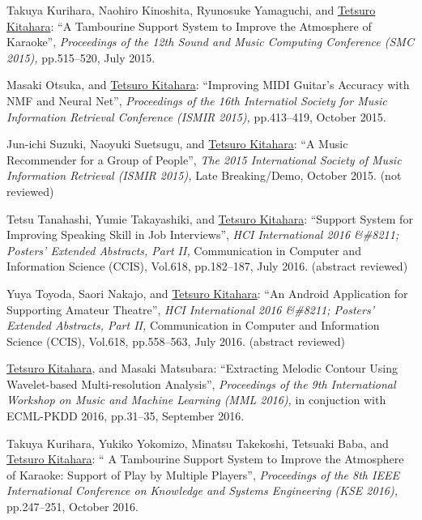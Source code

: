 \begin{Enumerate}
\item 
Takuya Kurihara, 
Naohiro Kinoshita, 
Ryunosuke Yamaguchi, 
and 
\underline{Tetsuro Kitahara}: 
    ``A Tambourine Support System to Improve the Atmosphere of Karaoke'', 
    {\it Proceedings of the 12th Sound and Music Computing Conference (SMC 2015),
    } pp.515--520, July 2015. 

\item 
Masaki Otsuka, 
and 
\underline{Tetsuro Kitahara}: 
    ``Improving MIDI Guitar's Accuracy with NMF and Neural Net'', 
    {\it Proceedings of the 16th Internatiol Society for Music Information Retrieval Conference (ISMIR 2015),
    } pp.413--419, October 2015. 

\item 
Jun-ichi Suzuki, 
Naoyuki Suetsugu, 
and 
\underline{Tetsuro Kitahara}: 
    ``A Music Recommender for a Group of People'', 
    {\it The 2015 International Society of Music Information Retrieval (ISMIR 2015),
    } Late Breaking/Demo, October 2015. 
(not reviewed)
\item 
Tetsu Tanahashi, 
Yumie Takayashiki, 
and 
\underline{Tetsuro Kitahara}: 
    ``Support  System for Improving Speaking Skill in Job Interviews'', 
    {\it HCI International 2016 \&\#8211; Posters' Extended Abstracts, Part II,
    } Communication in Computer and Information Science (CCIS), Vol.618, pp.182--187, July 2016. 
(abstract reviewed)
\item 
Yuya Toyoda, 
Saori Nakajo, 
and 
\underline{Tetsuro Kitahara}: 
    ``An Android Application for Supporting Amateur Theatre'', 
    {\it HCI International 2016 \&\#8211; Posters' Extended Abstracts, Part II,
    } Communication in Computer and Information Science (CCIS), Vol.618, pp.558--563, July 2016. 
(abstract reviewed)
\item 
\underline{Tetsuro Kitahara}, 
and 
Masaki Matsubara: 
    ``Extracting Melodic Contour Using Wavelet-based Multi-resolution Analysis'', 
    {\it Proceedings of the 9th International Workshop on Music and Machine Learning (MML 2016),
    } in conjuction with ECML-PKDD 2016, pp.31--35, September 2016. 

\item 
Takuya Kurihara, 
Yukiko Yokomizo, 
Minatsu Takekoshi, 
Tetsuaki Baba, 
and 
\underline{Tetsuro Kitahara}: 
    `` A Tambourine Support System to Improve the Atmosphere of Karaoke: Support of Play by Multiple Players'', 
    {\it Proceedings of the 8th IEEE International Conference on Knowledge and Systems Engineering (KSE 2016),
    } pp.247--251, October 2016. 


\end{Enumerate}
